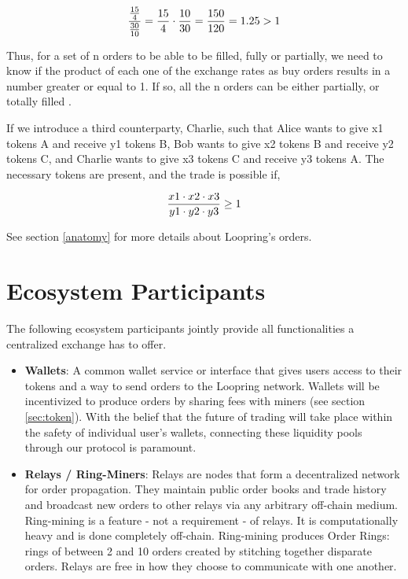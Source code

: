 \documentclass[UTF8,nofonts]{article}
\begin{document}
\begin{multicols}{2}
\begin{equation}
{{15\over 4} \over {30\over 10}} = {15 \over 4} \cdot {10 \over 30} = {150 \over 120} = 1.25 > 1
\end{equation}

Thus, for a set of n orders to be able to be filled, fully or partially, we need to know if the product of each one of the exchange rates as buy orders results in a number greater or equal to 1. If so, all the n orders can be either partially, or totally filled \cite{supersymmetry}.

If we introduce a third counterparty, Charlie, such that  Alice wants to give x1 tokens A and receive y1 tokens B, Bob wants to give x2 tokens B and receive y2 tokens C, and Charlie wants to give x3 tokens C and receive y3 tokens A. The necessary tokens are present, and the trade is possible if,

\begin{equation}
{{x1 \cdot x2 \cdot x3 \over y1 \cdot y2 \cdot y3} \geq 1}
\end{equation}


See section \ref{anatomy} for more details about Loopring's orders.


\section{Ecosystem Participants\label{sec:ecosystem}}
The following ecosystem participants jointly provide all functionalities a centralized exchange has to offer. 

\begin{itemize}

\item \textbf{Wallets}: A common wallet service or interface that gives users access to their tokens and a way to send orders to the Loopring network. Wallets will be incentivized to produce orders by sharing fees with miners (see section \ref{sec:token}). With the belief that the future of trading will take place within the safety of individual user's wallets, connecting these liquidity pools through our protocol is paramount.

\item \textbf{Relays / Ring-Miners}: Relays are nodes that form a decentralized network for order propagation. They maintain public order books and trade history and broadcast new orders to other relays via any arbitrary off-chain medium. Ring-mining is a feature - not a requirement - of relays. It is computationally heavy and is done completely off-chain. Ring-mining produces Order Rings: rings of between 2 and 10 orders created by stitching together disparate orders. Relays are free in how they choose to communicate with one another. 


\end{itemize}
\end{multicols}
\end{document}
